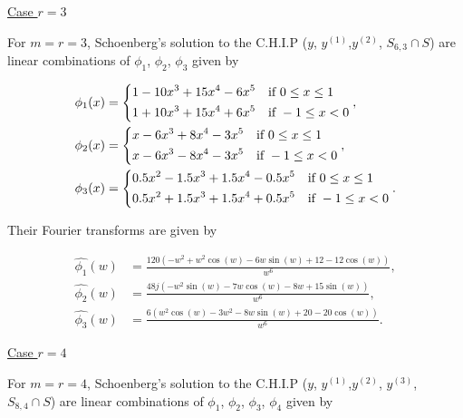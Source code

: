 \documentclass[a4paper, 11pt]{article}
\begin{document}
\underline{Case $r=3$}

For $m=r=3$, Schoenberg's solution to the C.H.I.P ($y$, $y^{(1)}$,$y^{(2)}$, $S_{6, 3} \cap S$) are linear combinations 
of $\phi_1$, $\phi_2$, $\phi_3$ given by

\begin{align*}
  \phi_1(x) &= \begin{dcases} 
    1 - 10 x^3 + 15 x^4 - 6 x^5 & \text{if } 0 \leq x \leq 1  \\
    1 + 10 x^3 + 15 x^4 + 6 x^5 & \text{if } -1 \leq x < 0 \\
  \end{dcases}, \\
  \phi_2(x) &= \begin{dcases}
    x - 6 x^3 + 8 x^4 - 3 x^5 & \text{if } 0 \leq x \leq 1  \\
    x - 6 x^3 - 8 x^4 - 3 x^5 & \text{if } -1 \leq x < 0 \\
  \end{dcases}, \\
  \phi_3(x) &= \begin{dcases}
    0.5 x^2 - 1.5 x^3 + 1.5 x^4 - 0.5 x^5 & \text{if } 0 \leq x \leq 1  \\
    0.5 x^2 + 1.5 x^3 + 1.5 x^4 + 0.5 x^5 & \text{if } -1 \leq x < 0 \\
  \end{dcases}.
\end{align*}

Their Fourier transforms are given by

\begin{align}
  \hat{\phi_1}(w) &= \frac{120(-w^2 + w^2 \cos(w) -6w\sin(w) + 12 - 12\cos(w))}{w^6}, \\
  \hat{\phi_2}(w) &= \frac{48j(-w^2 \sin(w) - 7w\cos(w) - 8w + 15\sin(w))}{w^6}, \\
  \hat{\phi_3}(w) &= \frac{6(w^2 \cos(w) -3 w^2 - 8w\sin(w) + 20 - 20\cos(w))}{w^6}.
\end{align}

\underline{Case $r=4$}

For $m=r=4$, Schoenberg's solution to the C.H.I.P ($y$, $y^{(1)}$,$y^{(2)}$, $y^{(3)}$, $S_{8, 4} \cap S$) are linear 
combinations of $\phi_1$, $\phi_2$, $\phi_3$, $\phi_4$ given by
\end{document}
